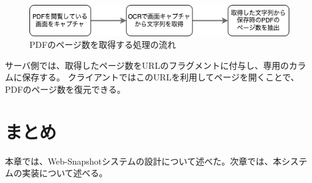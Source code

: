 \begin{figure}[htbp]
  \caption{PDFのページ数を取得する処理の流れ}
  \label{fig:design-pdf-page-num-extract}
  \begin{center}
    \includegraphics[bb=0 0 511 61,width=15cm]{img/040_design/design-pdf-page-num-extract.pdf}
  \end{center}
\end{figure}

サーバ側では、取得したページ数をURLのフラグメントに付与し、専用のカラムに保存する。
クライアントではこのURLを利用してページを開くことで、PDFのページ数を復元できる。

\section{まとめ}
本章では、Web-Snapshotシステムの設計について述べた。次章では、本システムの実装について述べる。
